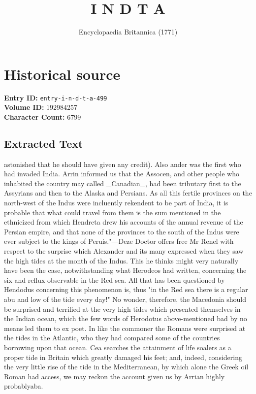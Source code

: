 \documentclass{article}
\title{I N D T A}
\date{Encyclopaedia Britannica (1771)}
\begin{document}
\maketitle

\section*{Historical source}
\textbf{Entry ID:} \texttt{entry-i-n-d-t-a-499} \\
\textbf{Volume ID:} 192984257 \\
\textbf{Character Count:} 6799

\subsection*{Extracted Text}
astonished that he should have given any credit). Also ander was the first who had invaded India. Arrin informed us that the Assocen, and other people who inhabited the country may called \_Canadian\_, had been tributary first to the Assyrians and then to the Alaska and Persians. As all this fertile provinces on the north-west of the Indus were incluently rekendent to be part of India, it is probable that what could travel from them is the sum mentioned in the ethnicized from which Hendreta drew his accounts of the annual revenue of the Persian empire, and that none of the provinces to the south of the Indus were ever subject to the kings of Peruis."—Deze Doctor offers free Mr Renel with respect to the surprise which Alexander and its many expressed when they saw the high tides at the month of the Indus. This he thinks might very naturally have been the case, notwithstanding what Herodeos had written, concerning the six and reflux observable in the Red sea. All that has been questioned by Hendodus concerning this phenomenon is, thus "in the Red sea there is a regular abu and low of the tide every day!" No wonder, therefore, the Macedonia should be surprised and terrified at the very high tides which presented themselves in the Indian ocean, which the few words of Herodotus above-mentioned bad by no means led them to ex poet. In like the commoner the Romans were surprised at the tides in the Atlantic, who they had compared some of the countries borrowing upon that ocean. Cea searches the attainment of life soalers as a proper tide in Britain which greatly damaged his feet; and, indeed, considering the very little rise of the tide in the Mediterranean, by which alone the Greek oil Roman had access, we may reckon the account given us by Arrian highly probablyaba.
\end{document}
